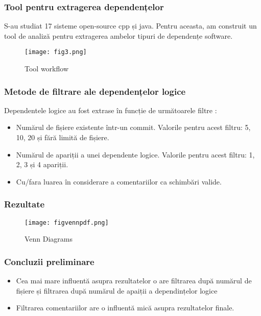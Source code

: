 \documentclass{beamer}
\begin{document}

 \begin{frame}
\frametitle{Tool pentru extragerea dependențelor }
S-au studiat 17 sisteme open-source cpp și java. Pentru aceasta, am construit un tool de analiză pentru extragerea ambelor tipuri de dependențe software. 
\begin{center}
     \begin{figure}
	\texttt{[image: fig3.png]}
	\caption{\label{fig:figtool} Tool workflow}
     \end{figure}
\end{center}

\end{frame}


 \begin{frame}
\frametitle{Metode de filtrare ale dependențelor logice}
Dependentele logice au fost extrase în funcție de următoarele filtre :

\begin{itemize}
\item Numărul de fișiere existente într-un commit. Valorile pentru acest filtru: 5, 10, 20 și fără limită de fișiere.
\item Numărul de apariții a unei dependente logice. Valorile pentru acest filtru: 1, 2, 3 și 4 apariții.
\item Cu/fara luarea în considerare a comentariilor ca schimbări valide.
\end{itemize}

\end{frame}


 \begin{frame}
\frametitle{Rezultate}

\begin{center}
     \begin{figure}
	\texttt{[image: figvennpdf.png]}
	\caption{\label{fig:figvenn} Venn Diagrams}
     \end{figure}
\end{center}


\end{frame}


 \begin{frame}
\frametitle{Concluzii preliminare}

\begin{itemize}
\item Cea mai mare influentă asupra rezultatelor o are filtrarea după numărul de fișiere și filtrarea după numărul de apaiții a dependințelor logice 
\item Filtrarea comentariilor are o influentă mică asupra rezultatelor finale.
\end{itemize}

\end{frame}
\end{document}
